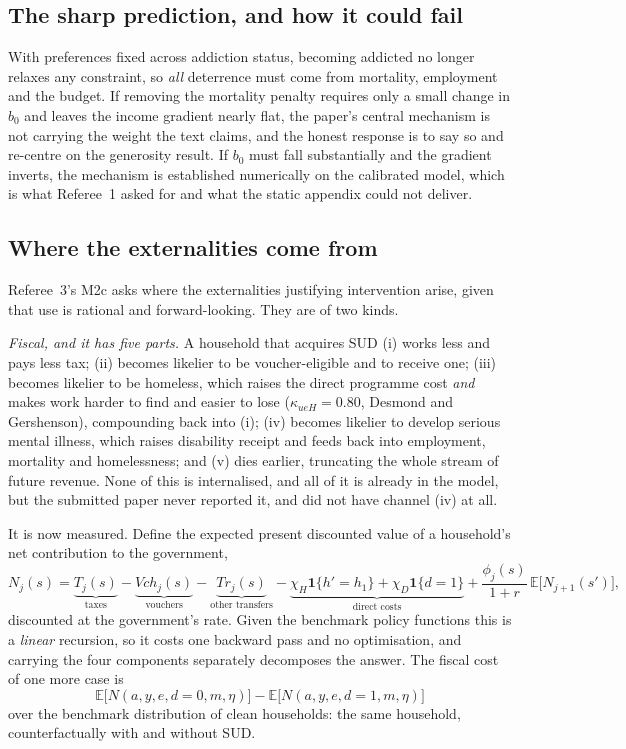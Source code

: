 \documentclass[11pt]{article}
\newcommand{\ind}[1]{\mathbf{1}\{#1\}}
\begin{document}
\subsection{The sharp prediction, and how it could fail}

With preferences fixed across addiction status, becoming addicted no longer
relaxes any constraint, so \emph{all} deterrence must come from mortality,
employment and the budget. If removing the mortality penalty requires only a
small change in $b_0$ and leaves the income gradient nearly flat, the paper's
central mechanism is not carrying the weight the text claims, and the honest
response is to say so and re-centre on the generosity result. If $b_0$ must fall
substantially and the gradient inverts, the mechanism is established numerically
on the calibrated model, which is what Referee~1 asked for and what the static
appendix could not deliver.

\subsection{Where the externalities come from}
\label{sec:extern}

Referee~3's M2c asks where the externalities justifying intervention arise, given
that use is rational and forward-looking. They are of two kinds.

\emph{Fiscal, and it has five parts.} A household that acquires SUD (i)
works less and pays less tax; (ii) becomes likelier to be voucher-eligible and to
receive one; (iii) becomes likelier to be homeless, which raises the direct
programme cost \emph{and} makes work harder to find and easier to lose
($\kappa_{ueH}=0.80$, Desmond and Gershenson), compounding back into (i);
(iv) becomes likelier to develop serious mental illness, which raises
disability receipt and feeds back into employment, mortality and homelessness;
and (v) dies earlier, truncating the whole stream of future revenue. None of
this is internalised, and all of it is already in the model, but the submitted
paper never reported it, and did not have channel (iv) at all.

It is now measured. Define the expected present discounted value of a
household's net contribution to the government,
\begin{equation}
N_j(s)=\underbrace{T_j(s)}_{\text{taxes}}-\underbrace{V\!ch_j(s)}_{\text{vouchers}}
-\underbrace{Tr_j(s)}_{\text{other transfers}}
-\underbrace{\chi_H\ind{h'=h_1}+\chi_D\ind{d=1}}_{\text{direct costs}}
+\frac{\phi_j(s)}{1+r}\,\mathbb E\bigl[N_{j+1}(s')\bigr],
\end{equation}
discounted at the government's rate. Given the benchmark policy functions this is
a \emph{linear} recursion, so it costs one backward pass and no optimisation, and
carrying the four components separately decomposes the answer. The fiscal cost of
one more case is
\[
\mathbb E\bigl[N(a,y,e,d=0,m,\eta)\bigr]-\mathbb E\bigl[N(a,y,e,d=1,m,\eta)\bigr]
\]
over the benchmark distribution of clean households: the same household,
counterfactually with and without SUD.
\end{document}
